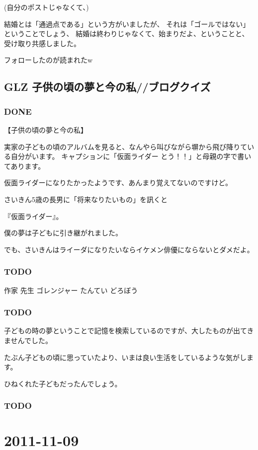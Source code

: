 \documentclass[11pt]{article}
\begin{document}
(自分のポストじゃなくて、)

結婚とは「通過点である」という方がいましたが、
それは「ゴールではない」ということでしょう、
結婚は終わりじゃなくて、始まりだよ、ということと、受け取り共感しました。

フォローしたのが読まれたw
\subsection{GLZ 子供の頃の夢と今の私//ブログクイズ}
\label{sec-40_2}
\subsubsection{\textbf{DONE}}
\label{sec-40_2_1}

【子供の頃の夢と今の私】

実家の子どもの頃のアルバムを見ると、なんやら叫びながら塀から飛び降りている自分がいます。
キャプションに「仮面ライダー とう！！」と母親の字で書いてあります。

仮面ライダーになりたかったようです、あんまり覚えてないのですけど。

さいきん5歳の長男に「将来なりたいもの」を訊くと

 『仮面ライダー』。

僕の夢は子どもに引き継がれました。

でも、さいきんはライーダになりたいならイケメン俳優にならないとダメだよ。
\subsubsection{\textbf{TODO}}
\label{sec-40_2_2}

作家
先生
ゴレンジャー
たんてい
どろぼう
\subsubsection{\textbf{TODO}}
\label{sec-40_2_3}

子どもの時の夢ということで記憶を検索しているのですが、大したものが出てきませんでした。

たぶん子どもの頃に思っていたより、いまは良い生活をしているような気がします。

ひねくれた子どもだったんでしょう。
\subsubsection{\textbf{TODO}}
\label{sec-40_2_4}
\section{2011-11-09}
\label{sec-41}
\end{document}
